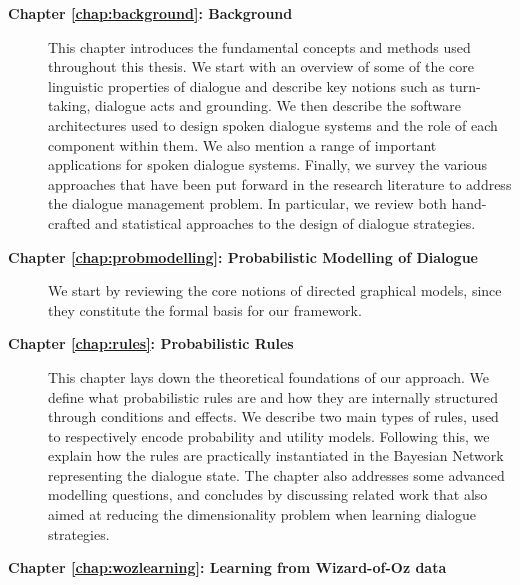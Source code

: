 \begin{description}
  \item[\textbf{Chapter \ref{chap:background}: Background}] \hfill  \vspace{2mm}
  
This chapter introduces the fundamental concepts and methods used throughout this thesis. We start with an overview of some of the core linguistic properties of dialogue and describe key notions such as turn-taking, dialogue acts and grounding.  We then describe the software architectures used to design spoken dialogue systems and the role of each component within them.  We also mention a range of important applications for spoken dialogue systems. Finally, we survey the various approaches that have been put forward in the research literature to address the dialogue management problem.  In particular, we review both hand-crafted and statistical approaches to the design of dialogue strategies.   \vspace{2mm}

  \item[\textbf{Chapter \ref{chap:probmodelling}: Probabilistic Modelling of Dialogue}] \hfill \vspace{2mm}

 We start by reviewing the core notions of directed graphical models, since they constitute the formal basis for our framework. 

  \item[\textbf{Chapter \ref{chap:rules}: Probabilistic Rules}] \hfill \vspace{2mm}
 
  This chapter lays down the theoretical foundations of our approach. We define what probabilistic rules are and how they are internally structured through conditions and effects.  We describe two main types of rules, used to respectively encode probability and utility models. Following this, we explain how the rules are practically instantiated in the Bayesian Network representing the dialogue state.  The chapter also addresses some advanced modelling questions, and concludes by discussing related work that also aimed at reducing the dimensionality problem when learning dialogue strategies.  \vspace{2mm}
  
  \item[\textbf{Chapter \ref{chap:wozlearning}: Learning from Wizard-of-Oz data}] \hfill  \vspace{2mm}
  

\end{description}
